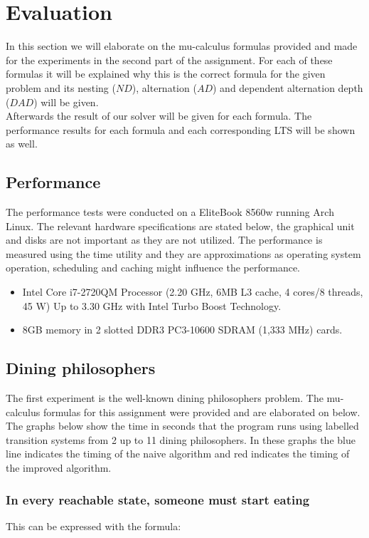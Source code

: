 \documentclass[10pt,a4paper]{article}
\begin{document}
\section{Evaluation}\label{eval}
In this section we will elaborate on the mu-calculus formulas provided and made for the experiments in the second part of the assignment. For each of these formulas it will be explained why this is the correct formula for the given problem and its nesting ($ND$), alternation ($AD$) and dependent alternation depth ($DAD$) will be given.\\
Afterwards the result of our solver will be given for each formula. The performance results for each formula and each corresponding LTS will be shown as well.

\subsection{Performance}

The performance tests were conducted on a EliteBook 8560w running Arch Linux. The relevant hardware specifications are stated below, the graphical unit and disks are not important as they are not utilized. The performance is measured using the time utility and they are approximations as operating system operation, scheduling and caching might influence the performance.

\begin{itemize}
	\item Intel Core i7-2720QM Processor (2.20 GHz, 6MB L3 cache, 4 cores/8 threads, 45 W) Up to 3.30 GHz with Intel Turbo Boost Technology.
	
	\item 8GB memory in 2 slotted DDR3 PC3-10600 SDRAM (1,333 MHz) cards.
\end{itemize}

\subsection{Dining philosophers}
The first experiment is the well-known dining philosophers problem. The mu-calculus formulas for this assignment were provided and are elaborated on below.\\
The graphs below show the time in seconds that the program runs using labelled transition systems from 2 up to 11 dining philosophers. In these graphs the blue line indicates the timing of the naive algorithm and red indicates the timing of the improved algorithm.

\subsubsection{In every reachable state, someone must start eating}
This can be expressed with the formula:
\end{document}
